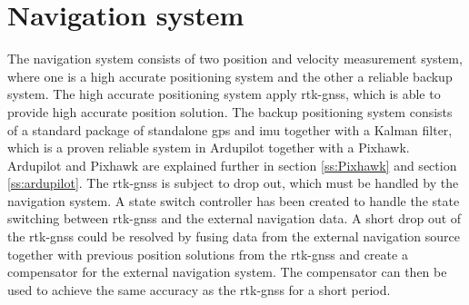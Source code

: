 \section{Navigation system}
The navigation system consists of two position and velocity measurement system, where one is a high accurate positioning system and the other a reliable backup system. The high accurate positioning system apply \gls{rtk-gnss}, which is able to provide high accurate position solution. The backup positioning system consists of a standard package of standalone \gls{gps} and \gls{imu} together with a Kalman filter, which is a proven reliable system in Ardupilot together with a Pixhawk. Ardupilot and Pixhawk are explained further in section \ref{ss:Pixhawk} and section \ref{ss:ardupilot}. The \gls{rtk-gnss} is subject to drop out, which must be handled by the navigation system. A state switch controller has been created to handle the state switching between \gls{rtk-gnss} and the external navigation data. A short drop out of the \gls{rtk-gnss} could be resolved by fusing data from the external navigation source together with previous position solutions from the \gls{rtk-gnss} and create a compensator for the external navigation system. The compensator can then be used to achieve the same accuracy as the \gls{rtk-gnss} for a short period.
